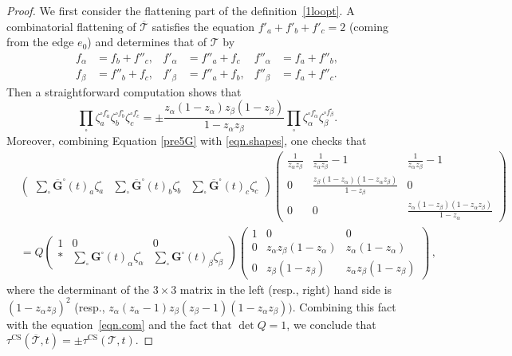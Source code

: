 \documentclass[12pt,reqno]{amsart}
\theoremstyle{definition}
\def\calT{\mathcal T}
\def\be{\begin{equation}}
\def\ee{\end{equation}}
\def\CS{\mathrm{CS}}
\begin{document}
\begin{proof}
We first consider the flattening part of the definition~\eqref{1loopt}.
A combinatorial flattening of $\overline{\calT}$ satisfies the equation
$f'_a+f'_b+f'_c=2$ (coming from the edge $e_0$) and determines that  of $\calT$ by 
\be
\label{eqn.flat}
\begin{aligned}
f_\alpha & =f_b+f''_c, & f'_\alpha & = f''_a+ f_c & f''_\alpha & =f_a+f''_b,\\
f_\beta & =f''_b+f_c, &  f'_\beta & = f''_a + f_b, & f''_\beta & =f_a+f''_c.
\end{aligned}
\ee	
Then a straightforward computation shows that
\be
\label{eqn.com}
\prod_\square \zeta^{\square f^\square_a}_a \zeta_b^{\square f^\square_b}
\zeta^{\square f^\square_c}_c =
\pm \frac{z_\alpha  (1-z_\alpha)z_\beta(1-z_\beta)}{1-z_\alpha z_\beta}
\prod_\square \zeta^{\square f^\square_\alpha}_\alpha
\zeta^{\square f^\square_\beta}_\beta  .
\ee
Moreover, combining Equation \eqref{pre5G} with \eqref{eqn.shapes}, one checks that
\begin{align*}
&	
\begin{pmatrix}
\displaystyle\sum_\square \overline{\mathbf{G}}^\square(t)_{a}\zeta^\square_a  & 
\displaystyle\sum_\square \overline{\mathbf{G}}^\square(t)_{b}\zeta^\square_b & 
\displaystyle\sum_\square \overline{\mathbf{G}}^\square(t)_{c}\zeta^\square_c \end{pmatrix}   
\begin{pmatrix}
\frac{1}{z_\alpha z_\beta} & \frac{1}{z_\alpha z_\beta}-1 & \frac{1}{z_\alpha z_\beta}-1 \\
0 & \frac{z_\beta(1-z_\alpha)(1-z_\alpha z_\beta)}{1-z_\beta} & 0 \\
0 & 0 & \frac{z_\alpha(1-z_\beta)(1-z_\alpha z_\beta)}{1-z_\alpha}
\end{pmatrix}\\
& = Q \begin{pmatrix}
1& 0  & 0 \\
\ast & \displaystyle\sum_\square \mathbf{G}^\square(t)_{\alpha} \zeta^\square_\alpha
&  \displaystyle\sum_\square \mathbf{G}^\square(t)_{\beta}\zeta^\square_\beta 
\end{pmatrix}
\begin{pmatrix} 1 & 0 & 0\\
0 & z_\alpha z_\beta(1-z_\alpha) & z_\alpha(1-z_\alpha) \\
0 & z_\beta (1-z_\beta) & z_\alpha z_\beta(1-z_\beta)			
\end{pmatrix}\,,
\end{align*}
where the determinant of the $3 \times 3$ matrix in the left (resp., right) hand
side is $(1-z_\alpha z_\beta)^2$ (resp., $z_\alpha (z_\alpha-1) z_\beta (z_\beta-1)
(1-z_\alpha z_\beta))$. Combining this fact with the equation~\eqref{eqn.com} and the fact that $\det Q=1$, we
conclude that $\tau^{\CS}(\overline{\calT},t) = \pm \tau^{\CS}(\calT,t)$.
\end{proof}
\end{document}
